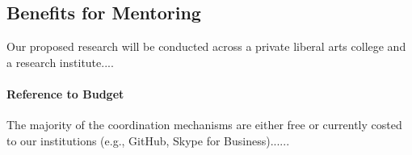 \subsection*{Benefits for Mentoring}
Our proposed research will be conducted across a private liberal arts college and a research institute....

\paragraph{Reference to Budget}
The majority of the coordination mechanisms are either free or currently costed to our institutions (e.g., GitHub, Skype for Business)......
